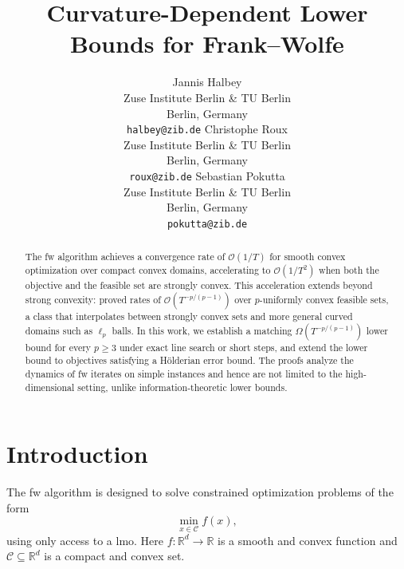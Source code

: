 \documentclass{article}
\title{Curvature-Dependent Lower Bounds for Frank--Wolfe}
\author{%
  Jannis Halbey\\
  Zuse Institute Berlin \& TU Berlin\\
  Berlin, Germany \\
  \texttt{halbey@zib.de}
  \And
  Christophe Roux\\
  Zuse Institute Berlin \& TU Berlin\\
  Berlin, Germany \\
  \texttt{roux@zib.de}
  \And
  Sebastian Pokutta\\
  Zuse Institute Berlin \& TU Berlin\\
  Berlin, Germany \\
  \texttt{pokutta@zib.de}
}
\newcommand{\R}{\mathbb{R}}
\newcommand{\C}{\mathcal{C}}
\newcommand{\bigo}[1]{\mathcal{O}( #1 )}
\newcommand{\bigomega}[1]{\Omega( #1 )}
\begin{document}
\maketitle


\begin{abstract}
The \gls{fw} algorithm achieves a convergence rate of $\bigo{1/T}$ for smooth convex optimization over compact convex domains, accelerating to $\bigo{1/T^2}$ when both the objective and the feasible set are strongly convex. This acceleration extends beyond strong convexity: \citet{kerdreux2021projection} proved rates of $\bigo{T^{-p/(p-1)}}$ over $p$-uniformly convex feasible sets, a class that interpolates between strongly convex sets and more general curved domains such as $\ell_p$ balls. In this work, we establish a matching $\bigomega{T^{-p/(p-1)}}$ lower bound for every $p\ge 3$ under exact line search or short steps, and extend the lower bound to objectives satisfying a Hölderian error bound. The proofs analyze the dynamics of \gls{fw} iterates on simple instances and hence are not limited to the high-dimensional setting, unlike information-theoretic lower bounds.
\end{abstract}

\section{Introduction}
The \acrfull{fw} algorithm \citep{frank1956algorithm} is designed to solve constrained optimization problems of the form
\begin{equation*}
  \min_{x\in\C} f(x),
\end{equation*}
using only access to a \gls{lmo}. Here $f:\R^d\to \R$ is a smooth and convex function and $\C\subseteq \R^d$ is a compact and convex set.
\end{document}

